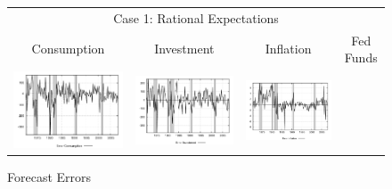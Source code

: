 \begin{figure}
\caption{Forecast Errors}\label{fg2:fe}\vspace*{1pc}\hspace*{-0.28in}
\begin{tabular}{cccc}
\multicolumn{4}{c}{Case 1: Rational Expectations} \\ 
Consumption & Investment & Inflation & Fed Funds \\
\includegraphics[scale=0.22]{results_re/consumption_err.png} & 
\includegraphics[scale=0.22]{results_re/investment_err.png} & 
\includegraphics[scale=0.22]{results_re/inflation_err.png} & 

\end{tabular}
\end{figure}
